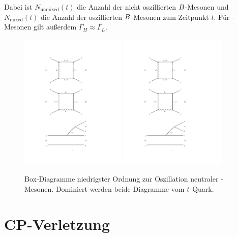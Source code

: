 Dabei ist $N_\text{unmixed}(t)$ die Anzahl der nicht oszillierten ${B}$-Mesonen und $N_\text{mixed}(t)$ die Anzahl der oszillierten ${B}$-Mesonen zum Zeitpunkt $t$. Für  \Bz-Mesonen gilt außerdem $\Gamma_H\approx\Gamma_L$.
\begin{figure}[htbp]
	\begin{center}
		\includegraphics[width=0.45\textwidth]{fig/B_mixing_1.pdf}
		\includegraphics[width=0.45\textwidth]{fig/B_mixing_2.pdf}
	\caption{Box-Diagramme niedrigster Ordnung zur Oszillation neutraler \Bz-Mesonen. Dominiert werden beide Diagramme vom ${t}$-Quark.}
	\label{fig:mixing}
 	\end{center}
\end{figure}

\section[head={$\CP$-Verletzung},tocentry={$\CP$-Verletzung}]{$\mathbf{CP}$-Verletzung}\label{sec:cpv}

